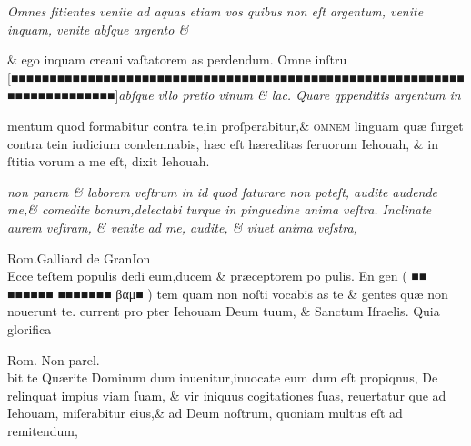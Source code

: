 \documentclass{article}
\begin{document}
{\begin{multicols}{2}
	\columnbreak
	\justifying
	\noindent
	\textit{Omnes ſitientes venite ad aquas etiam vos quibus non eſt argentum, venite inquam, venite abſque argento \&\\}
\end{multicols}
\fontsize{6.25}{7}\selectfont
\vspace{-2.7\baselineskip}
\noindent \& ego inquam creaui vaſtatorem as perdendum. Omne inſtru \hfill[\hfill ■■■■■■■■■■■■■■■■■■■■■■■■■■■■■■■■■■■■■■■■■■■■■■■■■■■■■■■■■■■■■■■■■■■■■■■■■\hfill]\hfill \textit{abſque vllo pretio vinum \& lac. Quare qppenditis argentum in}
\vspace{-1.6\baselineskip}
\begin{multicols}{2}
	\fontsize{6.25}{7}\selectfont
	\justifying
	\noindent mentum quod formabitur contra te,in proſperabitur,\& \textsc{ omnem} linguam qu\ae{} ſurget contra tein iudicium\linebreak
	condemnabis, h\ae{}c eſt h\ae{}reditas ſeruorum Iehouah, \& in ſtitia vorum a me eſt, dixit Iehouah.

	\columnbreak
	\justifying
	\noindent
	\textit{non panem \& laborem veſtrum in id quod ſaturare non poteſt, audite audende me,\& comedite bonum,delectabi\linebreak
		turque in pinguedine anima veſtra. Inclinate aurem veſtram, \& venite ad me, audite, \& viuet anima veſstra,
	}
\end{multicols}
\setlength{\columnsep}{3mm}
\begin{multicols}{4}
	\tiny
	\centering
	Rom.Galliard de GranIon\\
	\fontsize{4}{5}\selectfont
	\justifying
	\noindent \quad Ecce teſtem populis dedi eum,ducem \& pr\ae{}ceptorem po\linebreak
	pulis. En gen ( ■■ ■■■■■■ ■■■■■■■ βαμ■ ) tem quam non\linebreak
	noſti vocabis as te \& gentes qu\ae{} non nouerunt te. current pro\linebreak
	pter Iehouam Deum tuum, \& Sanctum Iſraelis. Quia glorifica

	\columnbreak

	\centering
	\tiny
	Rom. Non parel.\\
	\fontsize{3}{3.75}\selectfont
	\justifying
	\noindent bit te Qu\ae{}rite Dominum dum inuenitur,inuocate eum dum eſt propiqnus,\linebreak
	De relinquat impius viam ſuam, \& vir iniquus cogitationes ſuas, reuertatur\linebreak
	que ad Iehouam, miſerabitur eius,\& ad Deum noſtrum, quoniam multus eſt\linebreak
	ad remitendum,


\end{multicols}}
\end{document}
